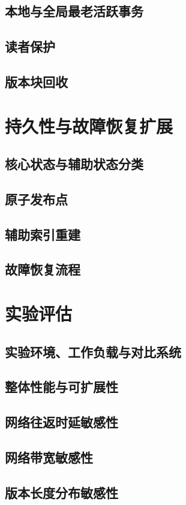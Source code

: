 \subsection{本地与全局最老活跃事务}
\subsection{读者保护}
\subsection{版本块回收}

\section{持久性与故障恢复扩展}
\subsection{核心状态与辅助状态分类}
\subsection{原子发布点}
\subsection{辅助索引重建}
\subsection{故障恢复流程}

\section{实验评估}
\subsection{实验环境、工作负载与对比系统}
\subsection{整体性能与可扩展性}
\subsection{网络往返时延敏感性}
\subsection{网络带宽敏感性}
\subsection{版本长度分布敏感性}

